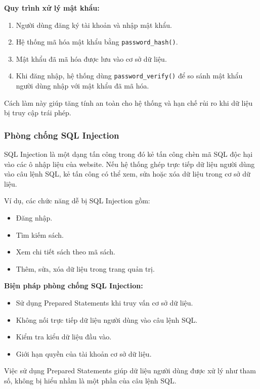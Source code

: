 \textbf{Quy trình xử lý mật khẩu:}

\begin{enumerate}
	\item Người dùng đăng ký tài khoản và nhập mật khẩu.
	\item Hệ thống mã hóa mật khẩu bằng \texttt{password\_hash()}.
	\item Mật khẩu đã mã hóa được lưu vào cơ sở dữ liệu.
	\item Khi đăng nhập, hệ thống dùng \texttt{password\_verify()} để so sánh mật khẩu người dùng nhập với mật khẩu đã mã hóa.
\end{enumerate}

Cách làm này giúp tăng tính an toàn cho hệ thống và hạn chế rủi ro khi dữ liệu bị truy cập trái phép.

\subsubsection{Phòng chống SQL Injection}

SQL Injection là một dạng tấn công trong đó kẻ tấn công chèn mã SQL độc hại vào các ô nhập liệu của website. Nếu hệ thống ghép trực tiếp dữ liệu người dùng vào câu lệnh SQL, kẻ tấn công có thể xem, sửa hoặc xóa dữ liệu trong cơ sở dữ liệu.

Ví dụ, các chức năng dễ bị SQL Injection gồm:

\begin{itemize}
	\item Đăng nhập.
	\item Tìm kiếm sách.
	\item Xem chi tiết sách theo mã sách.
	\item Thêm, sửa, xóa dữ liệu trong trang quản trị.
\end{itemize}

\textbf{Biện pháp phòng chống SQL Injection:}

\begin{itemize}
	\item Sử dụng Prepared Statements khi truy vấn cơ sở dữ liệu.
	\item Không nối trực tiếp dữ liệu người dùng vào câu lệnh SQL.
	\item Kiểm tra kiểu dữ liệu đầu vào.
	\item Giới hạn quyền của tài khoản cơ sở dữ liệu.
\end{itemize}

Việc sử dụng Prepared Statements giúp dữ liệu người dùng được xử lý như tham số, không bị hiểu nhầm là một phần của câu lệnh SQL.

